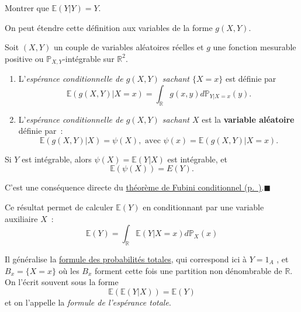 \label{III-autocond}
Montrer que \(\mathbb{E}(Y|Y) = Y\).

On peut étendre cette définition aux variables de la forme \(g(X,Y)\).

\begin{definition}\label{III-defespcondg}

Soit \((X,Y)\) un couple de variables aléatoires réelles et \(g\) une
fonction mesurable positive ou \(\mathbb{P}_{X,Y}\)-intégrable sur
\(\mathbb{R}^2\).

\begin{enumerate}
\def\labelenumi{\arabic{enumi}.}
\tightlist
\item
  L'\emph{espérance conditionnelle de \(g(X,Y)\) sachant \(\{X=x\}\)}
  est définie par
  \[\mathbb{E}(g(X,Y)|X=x) = \int_\mathbb{R}g(x,y) d\mathbb{P}_{Y|X=x} (y).\]
\item
  L'\emph{espérance conditionnelle de \(g(X,Y)\) sachant \(X\)} est la
  \textbf{variable aléatoire} définie par~:
  \[\mathbb{E}(g(X,Y)|X) = \psi(X), \text{ avec } \psi(x) = \mathbb{E}(g(X,Y)|X=x).\]
\end{enumerate}
\end{definition}

\begin{theoreme}\label{III-espuxe9rance-totale}

Si \(Y\) est intégrable, alors \(\psi(X) = \mathbb{E}(Y | X)\) est
intégrable, et \[\mathbb{E}( \psi(X)) = E( Y ) .\]
\end{theoreme}

\begin{preuve}
C'est une conséquence directe du
\protect\hyperref[III-fubinicond]{théorème de Fubini
conditionnel (p.~\pageref*{III-fubinicond})}.\hfill$\blacksquare$
\end{preuve}

Ce résultat permet de calculer \(\mathbb{E}( Y )\) en conditionnant par
une variable auxiliaire \(X\)~:
\[\mathbb{E}( Y ) = \int_\mathbb{R}\mathbb{E}(Y | X = x) d\mathbb{P}_X(x)\]

Il généralise la \href{Probabilité\%20I.pdf\%20\#formprobatot}{formule
des probabilités totales}, qui correspond ici à \(Y = 1_A\) , et
\(B_x = \{X = x\}\) où les \(B_x\) forment cette fois une partition non
dénombrable de \(\mathbb{R}\). On l'écrit souvent sous la forme
\[ \mathbb{E}\left( \mathbb{E}(Y | X) \right) = \mathbb{E}( Y )\] et on
l'appelle la \emph{formule de l'espérance totale}.

